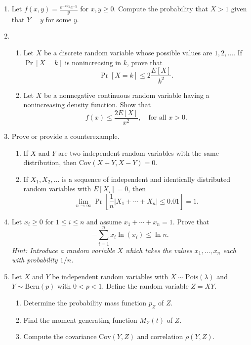 \documentclass[11pt,letterpaper]{article}
\newcommand{\Cov}{\text{Cov}}
\newcommand{\Pois}{\text{Pois}}
\newcommand{\Bern}{\text{Bern}}
\begin{document}
\begin{enumerate}
    \item Let $f(x,y) = \frac{e^{-x/y}e^{-y}}{y}$ for $x,y\geq 0$.
    Compute the probability that $X>1$ given that $Y = y$ for some $y$.

    \item \begin{enumerate}
        \item Let $X$ be a discrete random variable whose possible values are $1, 2, \ldots$.
        If $\Pr[X = k]$ is nonincreasing in $k$, prove that
        \[
            \Pr[X = k] \leq 2\frac{E[X]}{k^2}.
        \]

        \item Let $X$ be a nonnegative continuous random variable having a nonincreasing density function.
        Show that
        \[
            f(x) \leq \frac{2E[X]}{x^2},\quad\text{for all }x>0.
        \]
    \end{enumerate}

    \item Prove or provide a counterexample.
    \begin{enumerate}
        \item If $X$ and $Y$ are two independent random variables with the same distribution, then $\Cov(X+Y, X-Y) = 0$.

        \item If $X_1, X_2, \ldots$ is a sequence of independent and identically distributed random variables with $E[X_i] = 0$, then
        \[
            \lim_{n\to \infty}\Pr\left[\frac{1}{n}|X_1 + \cdots + X_n| \leq 0.01\right] = 1.
        \]
    \end{enumerate}


    \item Let $x_i\geq 0$ for $1\leq i \leq n$ and assume $x_1 + \cdots + x_n = 1$.
    Prove that
    \[
        -\sum_{i=1}^nx_i \ln(x_i) \leq \ln n.
    \]
    \textit{Hint: Introduce a random variable $X$ which takes the values $x_1, \ldots, x_n$ each with probability $1/n$.}

    \item Let $X$ and $Y$ be independent random variables with $X\sim \Pois(\lambda)$ and $Y\sim \Bern(p)$ with $0<p<1$.
    Define the random variable $Z = XY$.
    \begin{enumerate}
        \item Determine the probability mass function $p_Z$ of $Z$.
        \item Find the moment generating function $M_Z(t)$ of $Z$.
        \item Compute the covariance $\Cov(Y, Z)$ and correlation $\rho(Y, Z)$.
    \end{enumerate}

\end{enumerate}
\end{document}
